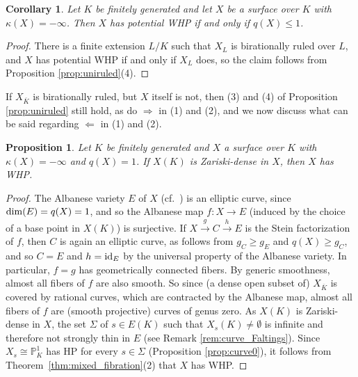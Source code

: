 \documentclass[10pt,a4paper]{amsart}
\theoremstyle{plain}
\newtheorem{corollary}[theorem]{Corollary}
\newtheorem{proposition}[theorem]{Proposition}
\theoremstyle{remark}
\numberwithin{theorem}{section}
\begin{document}
\begin{corollary}
Let $K$ be finitely generated and let $X$ be a surface over $K$ with $\kappa(X)=-\infty$. Then $X$ has potential WHP if and only if $q(X)\leq 1$.
\end{corollary}

\begin{proof}
There is a finite extension $L/K$ such that $X_L$ is birationally ruled over $L$,
and $X$ has potential WHP if and only if $X_L$ does,
so the claim follows from Proposition \ref{prop:uniruled}(4).
\end{proof}
 
If $X_{\overline{K}}$ is birationally ruled, but $X$ itself is not,
then (3) and (4) of Proposition \ref{prop:uniruled} still hold,
as do $\Rightarrow$ in (1) and (2),
and we now discuss what can be said regarding $\Leftarrow$ in (1) and (2).

\begin{proposition}\label{prop:q_is_one} 
Let $K$ be finitely generated and $X$ a surface over $K$ with $\kappa(X)=-\infty$ and $q(X)=1$.
If $X(K)$ is Zariski-dense in $X$, then $X$ has WHP.
\end{proposition}

\begin{proof} 
    The Albanese variety $E$ of $X$ (cf.~\cite[Definition~5.2, Theorem~5.3]{Badescu}) is an elliptic curve, since ${\rm dim}(E)=q(X)=1$, 
    and so the Albanese map $f\colon X\to E$ (induced by the choice of a base point in $X(K)$) is surjective. 
    If $X\stackrel{g}{\to} C\stackrel{h}{\to} E$ is the Stein factorization of $f$,
    then $C$ is again an elliptic curve,
    as follows from $g_C\geq g_E$ and $q(X)\geq g_C$,
    and so $C=E$ and $h={\rm id}_E$ by the universal property of the Albanese variety.
    In particular, $f=g$ has geometrically connected fibers. 
    By generic smoothness, almost all fibers of $f$ are also smooth. 
    So since (a dense open subset of) $X_{\overline{K}}$ is covered by rational curves, 
    which are contracted by the Albanese map,
    almost all fibers of $f$ are (smooth projective) curves of genus zero. 
    As $X(K)$ is Zariski-dense in $X$,
    the set $\Sigma$ of $s\in E(K)$ such that $X_s(K)\neq\emptyset$ 
    is infinite
    and therefore not strongly thin in $E$ (see Remark \ref{rem:curve_Faltings}).
    Since $X_s\cong\mathbb{P}^1_K$ has HP for every $s\in\Sigma$ (Proposition \ref{prop:curve0}),
    it follows 
    from Theorem~\ref{thm:mixed_fibration}(2) 
    that $X$ has WHP.
\end{proof}
\end{document}
